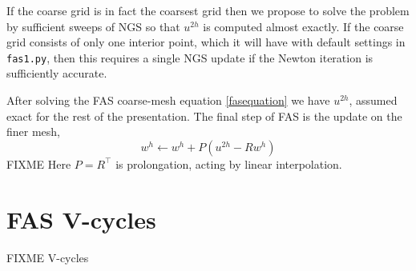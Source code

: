 \documentclass[letterpaper,final,12pt,reqno]{amsart}
\begin{document}
If the coarse grid is in fact the coarsest grid then we propose to solve the problem by sufficient sweeps of NGS so that $u^{2h}$ is computed almost exactly.  If the coarse grid consists of only one interior point, which it will have with default settings in \texttt{fas1.py}, then this requires a single NGS update if the Newton iteration is sufficiently accurate.

After solving the FAS coarse-mesh equation \eqref{fasequation} we have $u^{2h}$, assumed exact for the rest of the presentation.  The final step of FAS is the update on the finer mesh,
\begin{equation}
  w^h \longleftarrow w^h + P(u^{2h} - R w^h) \label{fasupdate}
\end{equation}
FIXME Here $P=R^\top$ is prolongation, acting by linear interpolation.



\section{FAS V-cycles}

FIXME V-cycles

\small

\bigskip


\end{document}
